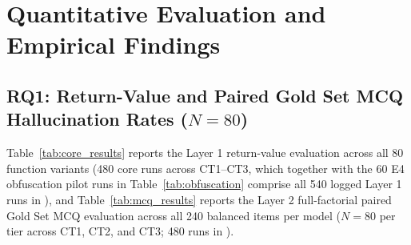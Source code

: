 \documentclass[runningheads]{llncs}
\begin{document}
\section{Quantitative Evaluation and Empirical Findings}

\subsection{RQ1: Return-Value and Paired Gold Set MCQ Hallucination Rates ($N=80$)}
Table~\ref{tab:core_results} reports the Layer 1 return-value evaluation across all 80 function variants (480 core runs across CT1--CT3, which together with the 60 E4 obfuscation pilot runs in Table~\ref{tab:obfuscation} comprise all 540 logged Layer 1 runs in ), and Table~\ref{tab:mcq_results} reports the Layer 2 full-factorial paired Gold Set MCQ evaluation across all 240 balanced items per model ($N=80$ per tier across CT1, CT2, and CT3; 480 runs in ).
\end{document}

